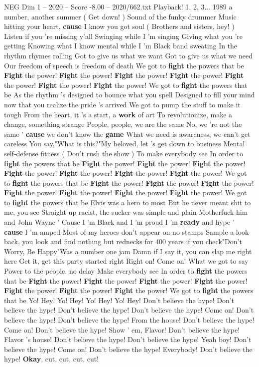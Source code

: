 \begin{textsample}{NEG Dim 1 – 2020 – Score -8.00 – 2020/662.txt}  \label{ex:f1_neg_034}
Playback! 1, 2, 3... 1989 a number, another summer ( Get down! ) Sound of the funky drummer Music hitting your heart, \textbf{cause} I know you got soul ( Brothers and sisters, hey! ) Listen if you 're missing y'all Swinging while I 'm singing Giving what you 're getting Knowing what I know mental while I 'm Black band sweating In the rhythm rhymes rolling Got to give us what we want Got to give us what we need Our freedom of speech is freedom of death We got to \textbf{fight} the powers that be \textbf{Fight} the power! \textbf{Fight} the power! \textbf{Fight} the power! \textbf{Fight} the power! \textbf{Fight} the power! \textbf{Fight} the power! \textbf{Fight} the power!
We got to \textbf{fight} the powers that be As the rhythm 's designed to bounce what you spell Designed to fill your mind now that you realize the pride 's arrived We got to pump the stuff to make it tough From the heart, it 's a start, a \textbf{work} of art To revolutionize, make a change, something strange People, people, we are the same No, we 're not the same ' \textbf{cause} we don't know the \textbf{game} What we need is awareness, we can't get careless You say,"What is this?"My beloved, let 's get down to business Mental self-defense fitness ( Don't rush the show ) To make everybody see In order to \textbf{fight} the powers that be \textbf{Fight} the power! \textbf{Fight} the power! \textbf{Fight} the power! \textbf{Fight} the power! \textbf{Fight} the power! \textbf{Fight} the power! \textbf{Fight} the power!
We got to \textbf{fight} the powers that be \textbf{Fight} the power! \textbf{Fight} the power! \textbf{Fight} the power! \textbf{Fight} the power! \textbf{Fight} the power! \textbf{Fight} the power! \textbf{Fight} the power!
We got to \textbf{fight} the powers that be Elvis was a hero to most But he never meant shit to me, you see Straight up racist, the sucker was simple and plain Motherfuck him and John Wayne ' Cause I 'm Black and I 'm proud I 'm \textbf{ready} and hype ' \textbf{cause} I 'm amped Most of my heroes don't appear on no stamps Sample a look back, you look and find nothing but rednecks for 400 years if you check"Don't Worry, Be Happy"Was a number one jam Damn if I say it, you can slap me right here Get it, get this party started right Right on!
Come on!
What we got to say Power to the people, no delay Make everybody see In order to \textbf{fight} the powers that be \textbf{Fight} the power! \textbf{Fight} the power! \textbf{Fight} the power! \textbf{Fight} the power! \textbf{Fight} the power! \textbf{Fight} the power! \textbf{Fight} the power!
We got to \textbf{fight} the powers that be Yo!
Hey!
Yo!
Hey!
Yo!
Hey!
Yo!
Hey!
Don't believe the hype!
Don't believe the hype!
Don't believe the hype!
Don't believe the hype!
Come on!
Don't believe the hype!
Don't believe the hype!
From the house!
Don't believe the hype!
Come on!
Don't believe the hype!
Show ' em, Flavor!
Don't believe the hype!
Flavor 's house!
Don't believe the hype!
Don't believe the hype!
Yeah boy!
Don't believe the hype!
Come on!
Don't believe the hype!
Everybody!
Don't believe the hype! \textbf{Okay}, cut, cut, cut, cut!

\end{textsample}
